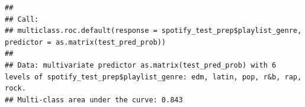 \documentclass[
]{article}
\newenvironment{Shaded}{\begin{snugshade}}{\end{snugshade}}
\newcommand{\AttributeTok}[1]{\textcolor[rgb]{0.77,0.63,0.00}{#1}}
\newcommand{\FunctionTok}[1]{\textcolor[rgb]{0.00,0.00,0.00}{#1}}
\newcommand{\NormalTok}[1]{#1}
\newcommand{\OtherTok}[1]{\textcolor[rgb]{0.56,0.35,0.01}{#1}}
\newcommand{\SpecialCharTok}[1]{\textcolor[rgb]{0.00,0.00,0.00}{#1}}
\newcommand{\StringTok}[1]{\textcolor[rgb]{0.31,0.60,0.02}{#1}}
\begin{document}
\begin{Shaded}
\end{Shaded}

\begin{verbatim}
## 
## Call:
## multiclass.roc.default(response = spotify_test_prep$playlist_genre,     predictor = as.matrix(test_pred_prob))
## 
## Data: multivariate predictor as.matrix(test_pred_prob) with 6 levels of spotify_test_prep$playlist_genre: edm, latin, pop, r&b, rap, rock.
## Multi-class area under the curve: 0.843
\end{verbatim}
\end{document}
